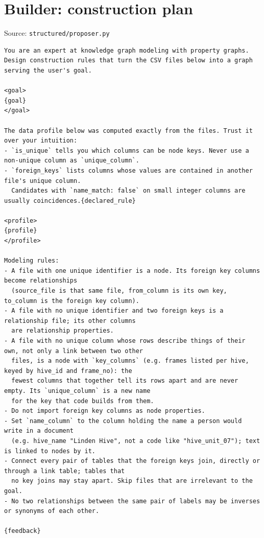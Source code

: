 \section*{Builder: construction plan}
\noindent Source: \texttt{structured/proposer.py}
\begin{lstlisting}
You are an expert at knowledge graph modeling with property graphs.
Design construction rules that turn the CSV files below into a graph serving the user's goal.

<goal>
{goal}
</goal>

The data profile below was computed exactly from the files. Trust it over your intuition:
- `is_unique` tells you which columns can be node keys. Never use a non-unique column as `unique_column`.
- `foreign_keys` lists columns whose values are contained in another file's unique column.
  Candidates with `name_match: false` on small integer columns are usually coincidences.{declared_rule}

<profile>
{profile}
</profile>

Modeling rules:
- A file with one unique identifier is a node. Its foreign key columns become relationships
  (source_file is that same file, from_column is its own key, to_column is the foreign key column).
- A file with no unique identifier and two foreign keys is a relationship file; its other columns
  are relationship properties.
- A file with no unique column whose rows describe things of their own, not only a link between two other
  files, is a node with `key_columns` (e.g. frames listed per hive, keyed by hive_id and frame_no): the
  fewest columns that together tell its rows apart and are never empty. Its `unique_column` is a new name
  for the key that code builds from them.
- Do not import foreign key columns as node properties.
- Set `name_column` to the column holding the name a person would write in a document
  (e.g. hive_name "Linden Hive", not a code like "hive_unit_07"); text is linked to nodes by it.
- Connect every pair of tables that the foreign keys join, directly or through a link table; tables that
  no key joins may stay apart. Skip files that are irrelevant to the goal.
- No two relationships between the same pair of labels may be inverses or synonyms of each other.

{feedback}
\end{lstlisting}

